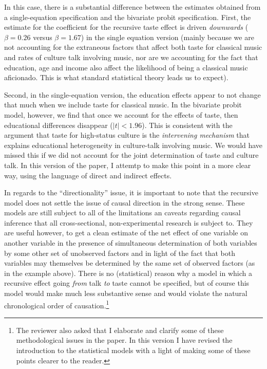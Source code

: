 \documentclass[11pt]{article}
\begin{document}
In this case, there is a substantial difference between the estimates obtained from a single-equation specification and the bivariate probit specification.  First, the estimate for the coefficient for the recursive taste effect is driven \emph{downwards} ($\beta=0.26$ versus $\beta=1.67$)  in the single equation version (mainly because we are not accounting for the extraneous factors that affect both taste for classical music and rates of culture talk involving music, nor are we accounting for the fact that education, age and income also affect the likelihood of being a classical music aficionado.  This is what standard statistical theory leads us to expect).  

Second, in the single-equation version, the education effects appear to not change that much when we include taste for classical music.  In the bivariate probit model, however, we find that once we account for the effects of taste, then educational differences disappear ($|t|<1.96$).  This is consistent with the argument that taste for high-status culture is the \emph{intervening mechanism} that explains educational heterogeneity in culture-talk involving music.  We would have missed this if we did not account for the joint determination of taste and culture talk.  In this version of the paper, I attemtp to make this point in a more clear way, using the language of direct and indirect effects. 

In regards to the ``directionality'' issue, it is important to note that the recursive model does not settle the issue of causal direction in the strong sense.  These models are still subject to all of the limitations an caveats regarding causal inference that all cross-sectional, non-experimental research is subject to.  They are useful however, to get a clean estimate of the net effect of one variable on another variable in the presence of simultaneous determination of both variables by some other set of  unobserved factors and in light of the fact that both variables may themselves be determined by the same set of observed factors (as in the example above).   There is no (statistical) reason why a model in which a recursive effect going \emph{from} talk \emph{to} taste cannot be specified, but of course this model would make much less substantive sense and would violate the natural chronological order of causation.\footnote{The reviewer also asked that I elaborate and clarify some of these methodological issues in the paper.  In this version I have revised the introduction to the statistical models with a light of making some of these points clearer to the reader.}
\end{document}
